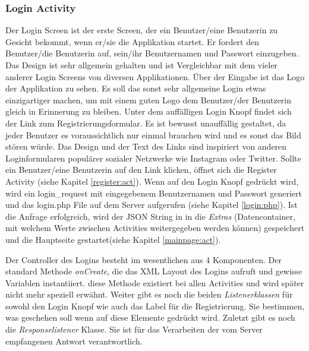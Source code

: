 \documentclass[a4paper,11pt]{report}
\begin{document}
				\subsubsection{Login Activity} \label{login:act}
				Der Login Screen ist der erste Screen, der ein Benutzer/eine Benutzerin zu Gesicht bekommt, wenn er/sie die Applikation startet. Er fordert den Benutzer/die Benutzerin auf, sein/ihr Benutzernamen und Passwort einzugeben. Das Design ist sehr allgemein gehalten und ist Vergleichbar mit dem vieler anderer Login Screens von diversen Applikationen. Über der Eingabe ist das Logo der Applikation zu sehen. Es soll das sonst sehr allgemeine Login etwas einzigartiger machen, um mit einem guten Logo dem Benutzer/der Benutzerin gleich in Erinnerung zu bleiben. Unter dem auffälligen Login Knopf findet sich der Link zum Registrierungsformular. Es ist bewusst unauffällig gestaltet, da jeder Benutzer es voraussichtlich nur einmal brauchen wird und es sonst das Bild stören würde. Das Design und der Text des Links sind inspiriert von anderen Loginformularen populärer sozialer Netzwerke wie Instagram oder Twitter. Sollte ein Benutzer/eine Benutzerin auf den Link klicken, öffnet sich die Register Activity (siehe Kapitel \ref{register:act}). Wenn auf den Login Knopf gedrückt wird, wird ein login\_request mit eingegebenem Benutzernamen und Passwort generiert und das login.php File auf dem Server aufgerufen (siehe Kapitel \ref{login:php}). Ist die Anfrage erfolgreich, wird der JSON String in in die \emph{Extras} (Datencontainer, mit welchem Werte zwischen Activities weitergegeben werden können) gespeichert und die Hauptseite gestartet(siehe Kapitel \ref{mainpage:act}).
				
				Der Controller des Logins besteht im wesentlichen aus 4 Komponenten. Der standard Methode \emph{onCreate}, die das XML Layout des Logins aufruft und gewisse Variablen instantiiert. diese Methode existiert bei allen Activities und wird später nicht mehr speziell erwähnt. Weiter gibt es noch die beiden \emph{Listenerklassen} für sowohl den Login Knopf wie auch das Label für die Registrierung. Sie bestimmen, was geschehen soll wenn auf diese Elemente gedrückt wird. Zuletzt gibt es noch die \emph{Responselistener} Klasse. Sie ist für das Verarbeiten der vom Server empfangenen Antwort verantwortlich. 
\end{document}
